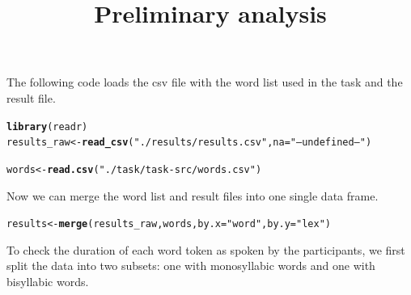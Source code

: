 \documentclass[a4paper,11pt]{article}\usepackage[]{graphicx}\usepackage[]{color}
\title{Preliminary analysis}
\makeatletter
\newcommand{\hlstr}[1]{\textcolor[rgb]{0.192,0.494,0.8}{#1}}%
\newcommand{\hlstd}[1]{\textcolor[rgb]{0.345,0.345,0.345}{#1}}%
\newcommand{\hlkwb}[1]{\textcolor[rgb]{0.69,0.353,0.396}{#1}}%
\newcommand{\hlkwc}[1]{\textcolor[rgb]{0.333,0.667,0.333}{#1}}%
\newcommand{\hlkwd}[1]{\textcolor[rgb]{0.737,0.353,0.396}{\textbf{#1}}}%
\newenvironment{kframe}{%
 \def\at@end@of@kframe{}%
 \ifinner\ifhmode%
  \def\at@end@of@kframe{\end{minipage}}%
  \begin{minipage}{\columnwidth}%
 \fi\fi%
 \def\FrameCommand##1{\hskip\@totalleftmargin \hskip-\fboxsep
 \colorbox{shadecolor}{##1}\hskip-\fboxsep
     \hskip-\linewidth \hskip-\@totalleftmargin \hskip\columnwidth}%
 \MakeFramed {\advance\hsize-\width
   \@totalleftmargin\z@ \linewidth\hsize
   \@setminipage}}%
 {\par\unskip\endMakeFramed%
 \at@end@of@kframe}
\newenvironment{knitrout}{}{} %
\makeatother
\begin{document}
\maketitle


The following code loads the csv file with the word list used in the task and the result file.

\begin{knitrout}
\color{fgcolor}\begin{kframe}
\begin{alltt}
\hlkwd{library}\hlstd{(readr)}
\hlstd{results_raw} \hlkwb{<-} \hlkwd{read_csv}\hlstd{(}\hlstr{"./results/results.csv"}\hlstd{,} \hlkwc{na} \hlstd{=} \hlstr{"--undefined--"}\hlstd{)}
\end{alltt}


{\ttfamily\noindent\itshape\color{messagecolor}{\#\# Parsed with column specification:\\\#\# cols(\\\#\#\ \  .default = col\_double(),\\\#\#\ \  speaker = col\_character(),\\\#\#\ \  idx = col\_integer(),\\\#\#\ \  word = col\_character()\\\#\# )}}

{\ttfamily\noindent\itshape\color{messagecolor}{\#\# See spec(...) for full column specifications.}}\begin{alltt}
\hlstd{words} \hlkwb{<-} \hlkwd{read.csv}\hlstd{(}\hlstr{"./task/task-src/words.csv"}\hlstd{)}
\end{alltt}
\end{kframe}
\end{knitrout}

Now we can merge the word list and result files into one single data frame.

\begin{knitrout}
\color{fgcolor}\begin{kframe}
\begin{alltt}
\hlstd{results} \hlkwb{<-} \hlkwd{merge}\hlstd{(results_raw, words,} \hlkwc{by.x} \hlstd{=} \hlstr{"word"}\hlstd{,} \hlkwc{by.y} \hlstd{=} \hlstr{"lex"}\hlstd{)}
\end{alltt}
\end{kframe}
\end{knitrout}

To check the duration of each word token as spoken by the participants, we first split the data into two subsets: one with monosyllabic words and one with bisyllabic words.
\end{document}
